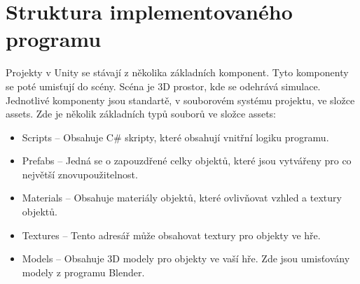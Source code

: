 \section{Struktura implementovaného programu}\label{SEC:StrukturaProgramu}
Projekty v Unity se stávají z několika základních komponent. Tyto komponenty se poté umisťují do scény. Scéna je 3D prostor, kde se odehrává simulace. Jednotlivé komponenty  jsou standartě, v souborovém systému projektu, ve složce assets. Zde je několik základních typů souborů ve složce assets:

\begin{itemize}
    \item Scripts -- Obsahuje C\# skripty, které obsahují vnitřní logiku programu.
    \item Prefabs -- Jedná se o zapouzdřené celky objektů, které jsou vytvářeny pro co největší znovupoužitelnost.
    \item Materials -- Obsahuje materiály objektů, které ovlivňovat vzhled a textury objektů.
    \item Textures -- Tento adresář může obsahovat textury pro objekty ve hře.
    \item Models -- Obsahuje 3D modely pro objekty ve vaší hře. Zde jsou umisťovány modely z programu Blender.
\end{itemize}

